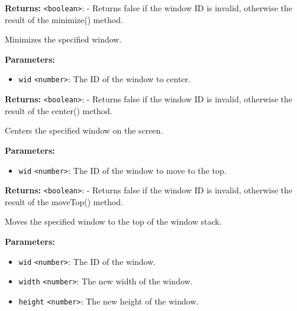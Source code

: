 \documentclass[12pt,a4paper]{article}
\begin{document}
\noindent \textbf{Returns:} \texttt{<boolean>}: - Returns false if the window ID is invalid, otherwise the result of the minimize() method.

\noindent Minimizes the specified window.

\vspace{5mm}
\noindent {}


\noindent \textbf{Parameters:}
\begin{itemize}
  \item \texttt{wid} \texttt{<number>}: The ID of the window to center.
\end{itemize}

\noindent \textbf{Returns:} \texttt{<boolean>}: - Returns false if the window ID is invalid, otherwise the result of the center() method.

\noindent Centers the specified window on the screen.

\vspace{5mm}
\noindent {}


\noindent \textbf{Parameters:}
\begin{itemize}
  \item \texttt{wid} \texttt{<number>}: The ID of the window to move to the top.
\end{itemize}

\noindent \textbf{Returns:} \texttt{<boolean>}: - Returns false if the window ID is invalid, otherwise the result of the moveTop() method.

\noindent Moves the specified window to the top of the window stack.

\vspace{5mm}
\noindent {}


\noindent \textbf{Parameters:}
\begin{itemize}
  \item \texttt{wid} \texttt{<number>}: The ID of the window.
  \item \texttt{width} \texttt{<number>}: The new width of the window.
  \item \texttt{height} \texttt{<number>}: The new height of the window.
\end{itemize}
\end{document}
